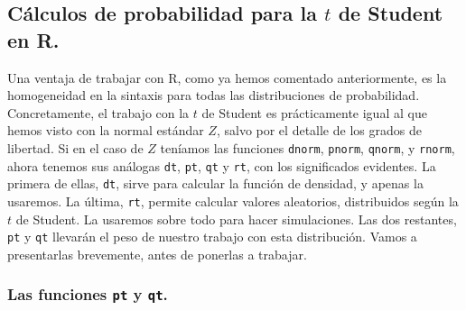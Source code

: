 \documentclass[10pt,a4paper]{article}\usepackage[]{graphicx}\usepackage[]{color}
\begin{document}
\subsection{Cálculos de probabilidad para la $t$ de Student en R.}
\label{tut06:subsec:CalculosProbabilidadtStudentConR}

Una ventaja de trabajar con R, como ya hemos comentado anteriormente, es la homogeneidad en la sintaxis para todas las distribuciones de probabilidad. Concretamente, el trabajo con la $t$ de Student es prácticamente igual al que hemos visto con la normal estándar $Z$, salvo por el detalle de los grados de libertad. Si en el caso de $Z$ teníamos las funciones {\tt dnorm}, {\tt pnorm}, {\tt qnorm}, y {\tt rnorm}, ahora tenemos sus análogas {\tt dt}, {\tt pt}, {\tt qt} y {\tt rt}, con los significados evidentes. La primera de ellas, {\tt dt}, sirve para calcular la función de densidad, y apenas la usaremos. La última, {\tt rt}, permite calcular valores aleatorios, distribuidos según la $t$ de Student. La usaremos sobre todo para hacer simulaciones. Las dos restantes, {\tt pt} y {\tt qt} llevarán el peso de nuestro trabajo con esta distribución. Vamos a presentarlas brevemente, antes de ponerlas a trabajar.

\subsubsection*{Las funciones {\tt pt} y {\tt qt}.}
\label{tut06:subsubsec:funcion_pt}
\end{document}
